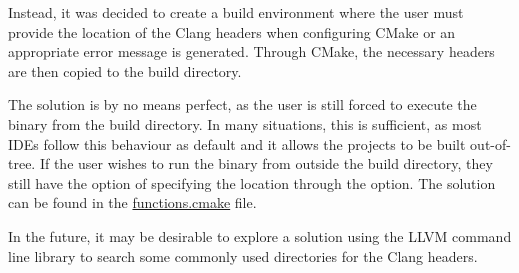 Instead, it was decided to create a build environment where the user must provide the location of the Clang headers when configuring CMake or an appropriate error message is generated. Through CMake, the necessary headers are then copied to the build directory.

The solution is by no means perfect, as the user is still forced to execute the binary from the build directory. In many situations, this is sufficient, as most IDEs follow this behaviour as default and it allows the projects to be built out-of-tree. If the user wishes to run the binary from outside the build directory, they still have the option of specifying the location through the  option. The solution can be found in the \href{https://github.com/mortenhaahr/RD/blob/main/examples/c_style_array_converter/cmake/functions.cmake}{functions.cmake} file.

In the future, it may be desirable to explore a solution using the LLVM command line library to search some commonly used directories for the Clang headers.
